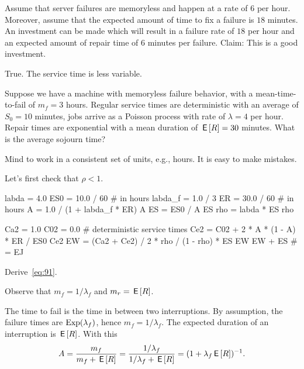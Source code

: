 \documentclass[stochastic-or.tex]{subfiles}
\begin{document}
\begin{truefalse}
Assume that server failures are memoryless and happen at a rate of $6$ per hour. Moreover, assume that the expected amount of time to fix a failure is $18$ minutes. An investment can be made which will result in a failure rate of $18$ per hour and an expected amount of repair time of $6$ minutes per failure.
Claim: This is a good investment.
\begin{solution}
        True. The service time is less variable.
\end{solution}
\end{truefalse}



\begin{exercise}\label{ex:l-157}
Suppose we have a machine with memoryless failure behavior, with a mean-time-to-fail of $m_{f}=3$ hours.
Regular service times are deterministic with an average of $S_{0}=10$ minutes, jobs arrive as a Poisson process with rate of $\lambda=4$ per hour.
Repair times are exponential with a mean duration of $\,\mathsf{E}\left[R\right] = 30$ minutes.
What is the average sojourn time?
\begin{hint}
 Mind to work in a consistent set of units, e.g., hours. It is easy to make mistakes.
\end{hint}
\begin{solution}
  Let's first check that $\rho< 1$.
\begin{pyconsole}
labda = 4.0
ES0 = 10.0 / 60  # in hours
labda_f = 1.0 / 3
ER = 30.0 / 60  # in hours
A = 1.0 / (1 + labda_f * ER)
A
ES = ES0 / A
ES
rho = labda * ES
rho
\end{pyconsole}
\begin{pyconsole}
Ca2 = 1.0
C02 = 0.0  # deterministic service times
Ce2 = C02 + 2 * A * (1 - A) * ER / ES0
Ce2
EW = (Ca2 + Ce2) / 2 * rho / (1 - rho) * ES
EW
EW + ES  # = EJ
\end{pyconsole}
\end{solution}
\end{exercise}

\begin{exercise}\label{ex:80}
 Derive~\cref{eq:91}.
\begin{hint}
 Observe that $m_f = 1/\lambda_f$ and $m_r = \,\mathsf{E}\left[R\right]$.
\end{hint}
\begin{solution}
  The time to fail is the time in between two interruptions.
  By assumption, the failure times are $\mathrm{Exp}(\lambda_f)$, hence $m_f = 1/\lambda_f$.
  The expected duration of an interruption is $\,\mathsf{E}\left[R\right]$.   With this
\begin{equation*}
 A=\frac{m_f}{m_f + \,\mathsf{E}\left[R\right]}=\frac{1/\lambda_f }{1/\lambda_f + \,\mathsf{E}\left[R\right]} = (1+\lambda_{f} \,\mathsf{E}\left[R\right])^{-1}.
\end{equation*}
\end{solution}
\end{exercise}
\end{document}
